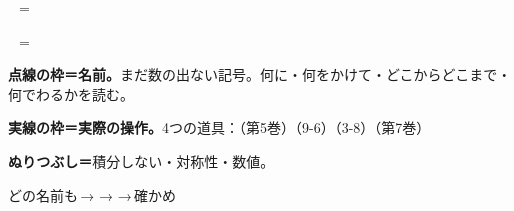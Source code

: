 \noindent\begin{minipage}{\linewidth}
\noindent\begin{minipage}[t]{0.36\linewidth}\vspace{0pt}\centering
{}\ $=$\ \par\vspace{4mm}
\ $=$\ \par\vspace{4mm}
\end{minipage}\hfill
\begin{minipage}[t]{0.62\linewidth}\raggedright\kixzbody\vspace{0pt}
{\sffamily\bfseries 点線の枠＝名前。}まだ数の出ない記号。何に・何をかけて・どこからどこまで・何でわるかを読む。\par
{\sffamily\bfseries 実線の枠＝実際の操作。}4つの道具：（第5巻）（9-6）（3-8）（第7巻）\par
{\sffamily\bfseries ぬりつぶし＝}\enspace 積分しない・対称性・数値。\par
どの名前も\enspace{}\,→\,\,→\,\,→\,確かめ
\end{minipage}\par\vspace{0.5mm}
\end{minipage}
\par\vspace{1.5mm plus 1fill}

